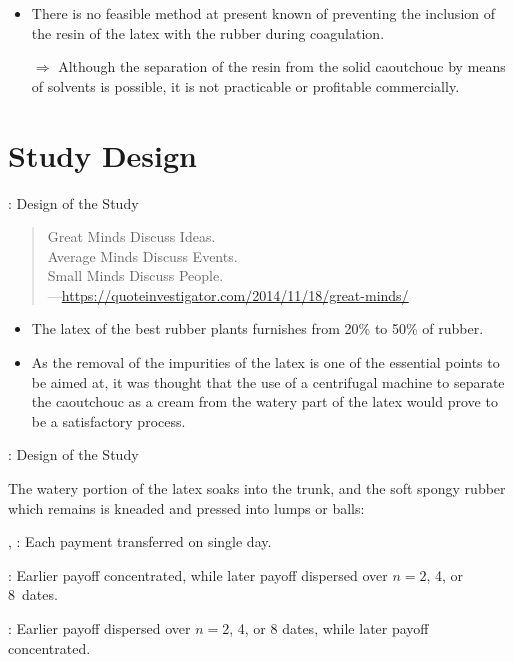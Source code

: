 \begin{frame}{\titleprefix}

	\begin{itemize}
		\item There is no feasible method at present known of preventing the inclusion of the resin of the latex with the rubber during coagulation.
		\item[$\Rightarrow$] Although the separation of the resin from the solid caoutchouc by means of solvents is possible, it is not practicable or profitable commercially.
	\end{itemize}

\end{frame}


\section{Study Design}


\begin{frame}{\titleprefix: Design of the Study}

	\begin{quote}
		Great Minds Discuss Ideas. \\
		Average Minds Discuss Events. \\
		Small Minds Discuss People. \\
		\upshape ---\url{https://quoteinvestigator.com/2014/11/18/great-minds/}
	\end{quote}

	\begin{itemize}
		\item The latex of the best rubber plants furnishes from 20\% to 50\% of rubber.
		\item As the removal of the impurities of the latex is one of the essential points to be aimed at, it was thought that the use of a centrifugal machine to separate the caoutchouc as a cream from the watery part of the latex would prove to be a satisfactory process.
	\end{itemize}

\end{frame}


\begin{frame}{\titleprefix: Design of the Study}

	The watery portion of the latex soaks into the trunk, and the soft spongy rubber which remains is kneaded and pressed into lumps or balls:
	
	\alert{\balA, \balB:} Each payment transferred on single day.
	
	\alert{\unbalA:} Earlier payoff concentrated, while later payoff dispersed over ${n = 2}$, 4, or 8~dates.
	
	\alert{\unbalB:} Earlier payoff dispersed over ${n = 2}$, 4, or 8 dates, while later payoff concentrated.

\end{frame}


